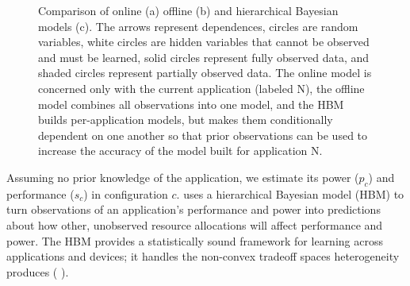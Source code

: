 {\begin{figure}
  \caption{ Comparison of online (a) offline (b) and hierarchical
    Bayesian models (c).  The arrows represent dependences, circles
    are random variables, white circles are hidden variables that
    cannot be observed and must be learned, solid circles represent
    fully observed data, and shaded circles represent partially
    observed data.  The online model is concerned only with the
    current application (labeled N), the offline model combines all
    observations into one model, and the HBM builds per-application
    models, but makes them conditionally dependent on one another so
    that prior observations can be used to increase the accuracy of
    the model built for application N.}
\label{fig:learning-models}
\end{figure}
}

Assuming no prior knowledge of the application, we estimate its power
($p_c$) and performance ($s_c$) in configuration $c$.
  \SYSTEM{} uses a hierarchical Bayesian model (HBM) to
turn observations of an application's performance and power into
predictions about how other, unobserved resource allocations will
affect performance and power.  The HBM provides a statistically sound
framework for learning across applications and devices; \ie{} it
handles the non-convex tradeoff spaces heterogeneity produces (\eg{}
).


